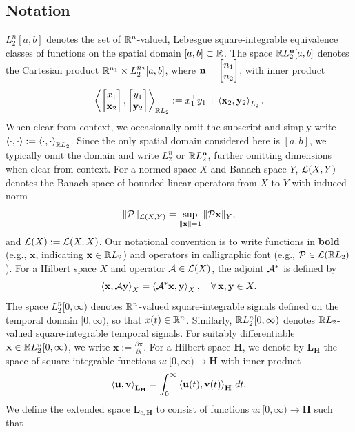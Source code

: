 \subsection{Notation}
$L_2^n[a,b]$ denotes the set of $\mathbb{R}^n$-valued, Lebesgue square-integrable equivalence classes of functions on the spatial domain $[a,b]\subset\mathbb{R}$. The space $\mathbb{R} L_2^{\mathbf{n}}[a,b]$ denotes the Cartesian product $\mathbb{R}^{n_1} \times L_2^{n_2}[a,b]$, where $\mathbf{n} = \begin{bmatrix}n_1 \\ n_2\end{bmatrix}$, with inner product
\begin{equation*}
	\left\langle \begin{bmatrix}x_1 \\ \mathbf{x}_2\end{bmatrix}, \begin{bmatrix}y_1 \\ \mathbf{y}_2\end{bmatrix} \right\rangle_{\mathbb{R} L_2}
	:= x_1^\top y_1 + \left\langle \mathbf{x}_2, \mathbf{y}_2 \right\rangle_{L_2}.
\end{equation*} When clear from context, we occasionally omit the subscript and simply write $\left\langle \cdot, \cdot \right\rangle := \left\langle \cdot, \cdot \right\rangle_{\mathbb{R} L_2}$. Since the only spatial domain considered here is $[a,b]$, we typically omit the domain and write $L_2^n$ or $\mathbb{R} L_2^{\mathbf{n}}$, further omitting dimensions when clear from context. For a normed space $X$ and Banach space $Y$, $\mathcal{L}(X,Y)$ denotes the Banach space of bounded linear operators from $X$ to $Y$ with induced norm
\[
	\|\mathcal{P}\|_{\mathcal{L}(X,Y)} = \sup_{\|\mathbf{x}\| = 1} \|\mathcal{P} \mathbf{x}\|_Y,
\] and $\mathcal{L}(X) := \mathcal{L}(X,X)$. Our notational convention is to write functions in \textbf{bold} (e.g., $\mathbf{x}$, indicating $\mathbf{x} \in \mathbb{R} L_2$) and operators in calligraphic font (e.g., $\mathcal{P} \in \mathcal{L}(\mathbb{R} L_2)$).
For a Hilbert space $X$ and operator $\mathcal{A} \in \mathcal{L}(X)$, the adjoint $\mathcal{A}^*$ is defined by
\[
	\left\langle \mathbf{x}, \mathcal{A} \mathbf{y} \right\rangle_X = \left\langle \mathcal{A}^* \mathbf{x}, \mathbf{y} \right\rangle_X,
	\quad \forall\, \mathbf{x},\mathbf{y} \in X.
\] The space $L_2^n[0,\infty)$ denotes $\mathbb{R}^n$-valued square-integrable signals defined on the temporal domain $[0,\infty)$, so that $x(t) \in \mathbb{R}^n$. Similarly, $\mathbb{R} L_2^n[0,\infty)$ denotes $\mathbb{R} L_2$-valued square-integrable temporal signals. For suitably differentiable $\mathbf{x} \in \mathbb{R} L_2^n[0,\infty)$, we write $\mathbf{\dot{x}} := \frac{\partial \mathbf{x}}{\partial t}$. For a Hilbert space $\mathbf{H}$, we denote by $\mathbf{L}_{\mathbf{H}}$ the space of square-integrable functions $u : [0,\infty) \to \mathbf{H}$ with inner product
\[
	\left\langle \mathbf{u}, \mathbf{v} \right\rangle_{\mathbf{L}_{\mathbf{H}}}
	= \int_0^\infty \left\langle \mathbf{u}(t), \mathbf{v}(t) \right\rangle_{\mathbf{H}}\, dt.
\] We define the extended space $\mathbf{L}_{e,\mathbf{H}}$ to consist of functions $u : [0,\infty) \to \mathbf{H}$ such that
